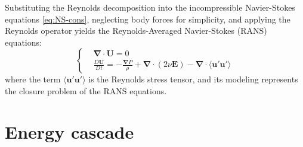 \documentclass[12pt, a4paper, twoside, openright]{book}
\begin{document}
Substituting the Reynolds decomposition into the incompressible Navier-Stokes equations \eqref{eq:NS-cons}, neglecting body forces for simplicity, and applying the Reynolds operator yields the Reynolds-Averaged Navier-Stokes (RANS) equations:
\begin{equation}
	\left\{
	\begin{aligned}
		 & \bm{\nabla} \cdot \bm{U} = 0                                                                                                           \\
		 & \frac{D\bm{U}}{Dt} = -\frac{\bm{\nabla} P}{\rho} + \bm{\nabla} \cdot (2\nu \bm{E}) - \bm{\nabla} \cdot \langle \bm{u}' \bm{u}' \rangle
	\end{aligned}
	\right.
	\label{eq:rans}
\end{equation}
where the term $\langle \bm{u}' \bm{u}' \rangle$ is the Reynolds stress tensor, and its modeling represents the closure problem of the RANS equations.

\section{Energy cascade}
\end{document}
